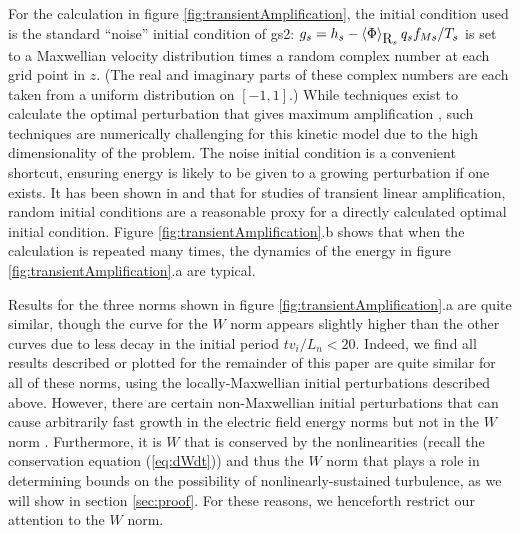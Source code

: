 \documentclass{jpp}
\begin{document}
For the calculation in figure \ref{fig:transientAmplification}, the
initial condition used is the standard ``noise'' initial condition of
gs2: $g_s = h_s - \left< \Phi\right>_{\boldsymbol{$R$}_s} q_s f_{Ms} / T_s$ is
set to a Maxwellian velocity distribution times a random complex
number at each grid point in $z$.  (The real and imaginary parts of
these complex numbers are each taken from a uniform distribution on
$[-1,1]$.)  While techniques exist to calculate the optimal
perturbation that gives maximum amplification \citep{FarrellIoannou,
  SquirePRL, SquireApJ}, such techniques are numerically challenging
for this kinetic model due to the high dimensionality of the problem.
The noise initial condition is a convenient shortcut, ensuring energy
is likely to be given to a growing perturbation if one exists.  It has
been shown in \citet{Camargo} and \citet{SquireApJ} that for studies of transient
linear amplification, random initial conditions are a reasonable proxy
for a directly calculated optimal initial condition.
Figure \ref{fig:transientAmplification}.b shows that 
when the calculation is repeated many times, the dynamics of the energy in figure \ref{fig:transientAmplification}.a are typical.

Results for the three norms shown in figure
\ref{fig:transientAmplification}.a are quite similar, though the curve
for the $W$ norm appears slightly higher than the other curves due to
less decay in the initial period $t v_i / L_n <20$.  Indeed, we find
all results described or plotted for the remainder of this paper are
quite similar for all of these norms, 
using the locally-Maxwellian
initial perturbations described above.  However, there are certain
non-Maxwellian initial perturbations that can cause arbitrarily fast
growth in the electric field energy norms but not in the $W$ norm \citep{GregIan}.
Furthermore, it is $W$ that is conserved by the nonlinearities (recall
the conservation equation (\ref{eq:dWdt})) and thus the $W$ norm that
plays a role in determining bounds on the possibility of
nonlinearly-sustained turbulence, as we will show in section
\ref{sec:proof}.  For these reasons, we henceforth restrict our attention
to the $W$ norm.
\end{document}
